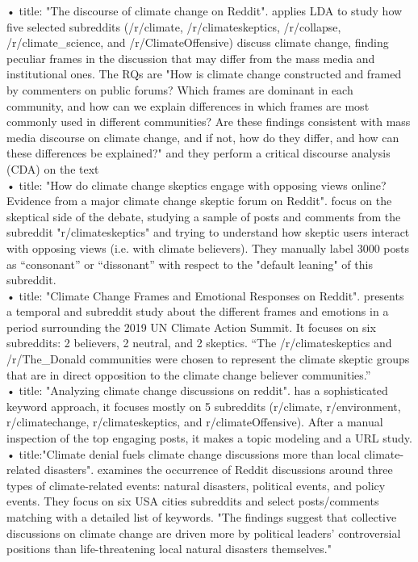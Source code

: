 \begin{itemize}
• \cite{gadanidis2020discourse} title: "The discourse of climate change on Reddit". applies LDA to study how five selected subreddits (/r/climate, /r/climateskeptics, /r/collapse, /r/climate\_science, and /r/ClimateOffensive) discuss climate change, finding peculiar frames in the discussion that may differ from the mass media and institutional ones. The RQs are "How is climate change constructed and framed by commenters on public forums? Which frames are dominant in each community, and how can we explain differences in which frames are most commonly used in different communities? Are these findings consistent with mass media discourse on climate change, and if not, how do they differ, and how can these differences be explained?" and they perform a critical discourse analysis (CDA) on the text\\

• \cite{oswald2022climate} title: "How do climate change skeptics engage with opposing views online? Evidence from a major climate change skeptic forum on Reddit".  focus on the skeptical side of the debate, studying a sample of posts and comments from the subreddit "r/climateskeptics" and trying to understand how skeptic users interact with opposing views (i.e. with climate believers). They manually label 3000 posts as “consonant” or “dissonant” with respect to the "default leaning" of this subreddit.  \\

• \cite{villanueva2021climate} title: "Climate Change Frames and Emotional Responses on Reddit". presents a temporal and subreddit study about the different frames and emotions in a period surrounding the 2019 UN Climate Action Summit. It focuses on six subreddits:  2 believers, 2 neutral, and 2 skeptics. “The /r/climateskeptics and /r/The\_Donald communities were chosen to represent the climate skeptic groups that are in direct opposition to the climate change believer communities.”\\

• \cite{parsa2022analyzing}  title: "Analyzing climate change discussions on reddit". has a sophisticated keyword approach, it focuses mostly on 5 subreddits (r/climate, r/environment, r/climatechange, r/climateskeptics, and r/climateOffensive). After a manual inspection of the top engaging posts, it makes a topic modeling and a URL study.\\

• \cite{shah2021climate} title:"Climate denial fuels climate change discussions more than local climate-related disasters". examines the occurrence of Reddit discussions around three types of climate-related events: natural disasters, political events, and policy events. They focus on six USA cities subreddits and select posts/comments matching with a detailed list of keywords. "The findings suggest that collective discussions on climate change are driven more by political leaders’ controversial positions than life-threatening local natural disasters themselves."\\


\end{itemize}
